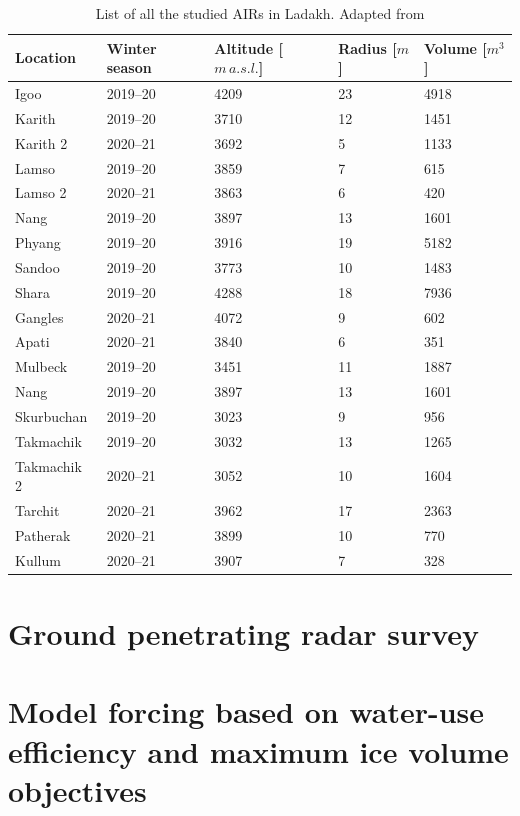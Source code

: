 \begin{table}[htb]
  \centering
  \caption{List of all the studied AIRs in Ladakh. Adapted from \citet{mariagruberIceStupasLadakh2022}}
	\label{tab:Ladakh_AIRs}
	\begin{tabular}{|lllll|}
    \hline
    \textbf{Location}     & \textbf{Winter season} & \textbf{Altitude [$m\,a.s.l.$]} & \textbf{
    Radius [$m$]} & \textbf{Volume [$m^3$]} \\ \hline
    Igoo & 2019--20 & 4209 & 23 & 4918  \\
    Karith & 2019--20 & 3710 & 12 & 1451  \\
    Karith 2 & 2020--21 & 3692 & 5 & 1133  \\
    Lamso & 2019--20 & 3859 & 7 & 615  \\
    Lamso 2& 2020--21 & 3863 & 6 & 420  \\
    Nang& 2019--20 & 3897 & 13 & 1601 \\
    Phyang& 2019--20 & 3916 & 19 & 5182 \\
    Sandoo& 2019--20 & 3773 & 10 & 1483 \\
    Shara& 2019--20 & 4288 & 18 & 7936 \\
    Gangles& 2020--21 & 4072 & 9 & 602 \\
    Apati& 2020--21 & 3840 & 6 & 351 \\
    Mulbeck& 2019--20 & 3451 & 11 & 1887\\
    Nang& 2019--20 & 3897 & 13 & 1601\\
    Skurbuchan& 2019--20 & 3023 & 9 & 956\\
    Takmachik& 2019--20 & 3032 & 13 &1265\\
    Takmachik 2& 2020--21 & 3052 & 10 &1604\\
    Tarchit& 2020--21 & 3962 & 17 &2363\\
    Patherak& 2020--21 & 3899 & 10 &770\\
    Kullum& 2020--21 & 3907 & 7 &328\\ \hline
	\end{tabular}
\end{table}


\section{Ground penetrating radar survey}
\label{sec:gpr}

\section{Model forcing based on water-use efficiency and maximum ice volume objectives}
\label{sec:auto_software}

